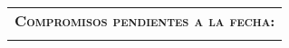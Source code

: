 \documentclass[12pt]{report}
\begin{document}
\vspace{0.3 cm}

\begin{minipage}{\textwidth}
	\begin{tabular}{l}
		\begin{minipage}[t]{\textwidth}%
			\cellcolor{blue!10}\textsc{\textbf{Compromisos pendientes a la fecha:}}
		\end{minipage}
		\vspace{0.1cm}\\
		\begin{minipage}[t]{\textwidth}%
			\cellcolor{white!10}{\todo}
		\end{minipage}
	\end{tabular}	
\end{minipage}
\end{document}
